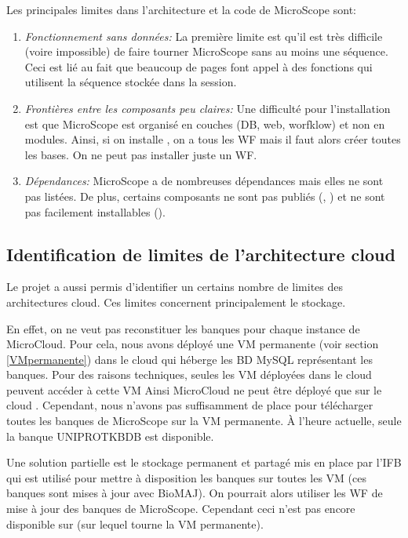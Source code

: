 Les principales limites dans l'architecture et la code de MicroScope sont:
\begin{enumerate}
    \item \emph{Fonctionnement sans données:} La première limite est
          qu'il est très difficile (voire impossible) de faire tourner MicroScope sans au moins une séquence.
          Ceci est lié au fait que beaucoup de pages font appel à des fonctions qui utilisent la séquence stockée dans la session.
    \item \emph{Frontières entre les composants peu claires:} Une difficulté pour l'installation est que MicroScope est organisé en couches (DB, web, worfklow) et non en modules.
          Ainsi, si on installe , on a tous les WF mais il faut alors créer toutes les bases.
          On ne peut pas installer juste un WF.
    \item \emph{Dépendances:} MicroScope a de nombreuses dépendances mais elles ne sont pas listées.
          De plus, certains composants ne sont pas publiés (, )
          et ne sont pas facilement installables ().
\end{enumerate}

\subsection{Identification de limites de l'architecture cloud} \label{subsec:limites_coud}

Le projet a aussi permis d'identifier un certains nombre de limites des architectures cloud.
Ces limites concernent principalement le stockage.

En effet, on ne veut pas reconstituer les banques pour chaque instance de MicroCloud.
Pour cela, nous  avons déployé une VM permanente (voir section \ref{VMpermanente}) dans le cloud 
qui héberge les BD MySQL représentant les banques.
Pour des raisons techniques, seules les VM déployées dans le cloud 
peuvent accéder à cette VM
Ainsi MicroCloud ne peut être déployé que sur le cloud .
Cependant, nous n'avons pas suffisamment de place pour télécharger toutes les banques de MicroScope sur la VM permanente.
À l'heure actuelle, seule la banque UNIPROTKBDB est disponible.

Une solution partielle est le stockage permanent et partagé mis en place par l'IFB
qui est utilisé pour mettre à disposition les banques sur toutes les VM (ces banques sont mises à jour avec BioMAJ).
On pourrait alors utiliser les WF de mise à jour des banques de MicroScope.
Cependant ceci n'est pas encore disponible sur  (sur lequel tourne la VM permanente).

